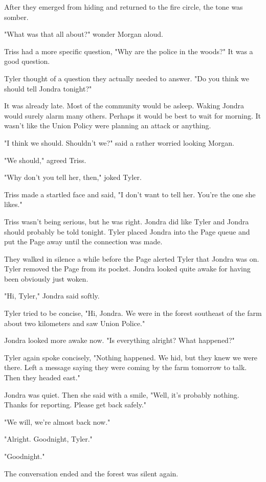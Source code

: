 \documentclass[courier]{sffms}
\begin{document}
After they emerged from hiding and returned
to the fire circle, the tone was somber.

"What was that all about?" wonder Morgan aloud.

Triss had a more specific question, 
"Why are the police in the woods?" It was a good
question.

Tyler thought of a question they actually needed
to answer. "Do you think we should tell Jondra
tonight?"

It was already late. Most of the community would
be asleep. Waking Jondra would surely alarm many
others. Perhaps it would be best to wait for morning.
It wasn't like the Union Policy were planning an
attack or anything.

"I think we should. Shouldn't we?" said a rather
worried looking Morgan.

"We should," agreed Triss.

"Why don't you tell her, then," joked Tyler.

Triss made a startled face and said, 
"I don't want to tell her. You're the one she likes."

Triss wasn't being serious, but he was right. Jondra
did like Tyler and Jondra should probably be told tonight.
Tyler placed Jondra into the Page queue and
put the Page away until the connection was made.

They walked in silence a while before the Page
alerted Tyler that Jondra was on. Tyler removed
the Page from its pocket. Jondra looked quite
awake for having been obviously just woken.

"Hi, Tyler," Jondra said softly.

Tyler tried to be concise, "Hi, Jondra. We were in
the forest southeast of the farm about two
kilometers and saw Union Police."

Jondra looked more awake now. "Is everything
alright? What happened?"

Tyler again spoke concisely, "Nothing happened.
We hid, but they knew we were there.
Left a message saying
they were coming by the farm tomorrow to talk.
Then they headed east."

Jondra was quiet. Then she said with a smile,
"Well, it's probably nothing. Thanks for
reporting. Please get back safely."

"We will, we're almost back now."

"Alright. Goodnight, Tyler."

"Goodnight."

The conversation ended and the forest was 
silent again.
\end{document}
